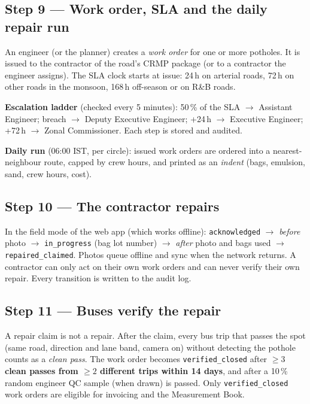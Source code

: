 \documentclass[11pt,a4paper]{article}
\newcommand{\code}[1]{\texttt{\small #1}}
\begin{document}
\subsection{Step 9 --- Work order, SLA and the daily repair run}
An engineer (or the planner) creates a \emph{work order} for one or more potholes. It is issued to the contractor of
the road's CRMP package (or to a contractor the engineer assigns). The SLA clock starts at issue: 24\,h on arterial
roads, 72\,h on other roads in the monsoon, 168\,h off-season or on R\&B roads.

\textbf{Escalation ladder} (checked every 5 minutes): 50\,\% of the SLA $\rightarrow$ Assistant Engineer;
breach $\rightarrow$ Deputy Executive Engineer; +24\,h $\rightarrow$ Executive Engineer; +72\,h $\rightarrow$ Zonal
Commissioner. Each step is stored and audited.

\textbf{Daily run} (06:00 IST, per circle): issued work orders are ordered into a nearest-neighbour route, capped by
crew hours, and printed as an \emph{indent} (bags, emulsion, sand, crew hours, cost).

\subsection{Step 10 --- The contractor repairs}
In the field mode of the web app (which works offline): \code{acknowledged} $\rightarrow$ \emph{before} photo
$\rightarrow$ \code{in\_progress} (bag lot number) $\rightarrow$ \emph{after} photo and bags used $\rightarrow$
\code{repaired\_claimed}. Photos queue offline and sync when the network returns. A contractor can only act on their
own work orders and can never verify their own repair. Every transition is written to the audit log.

\subsection{Step 11 --- Buses verify the repair}
A repair claim is not a repair. After the claim, every bus trip that passes the spot (same road, direction and
lane band, camera on) without detecting the pothole counts as a \emph{clean pass}. The work order becomes
\code{verified\_closed} after \textbf{$\ge3$ clean passes from $\ge2$ different trips within 14 days}, and after a
10\,\% random engineer QC sample (when drawn) is passed. Only \code{verified\_closed} work orders are eligible for
invoicing and the Measurement Book.
\end{document}
